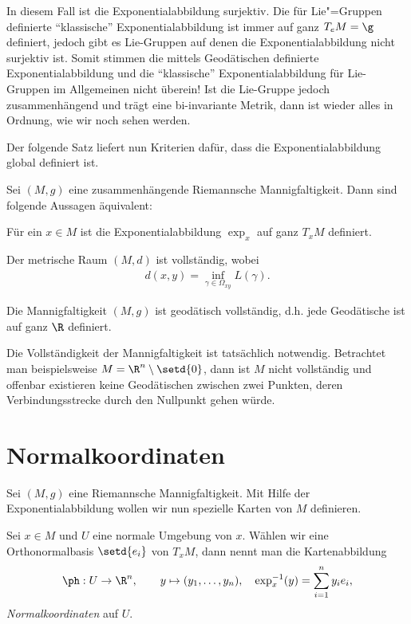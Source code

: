 \documentclass[%
	paper=a5,%
	fleqn,%
	DIV=18,%
	BCOR=0mm,
	fontsize=11pt,
	titlepage=false,%
	bibliography=totoc,
	DIV=18,%
	twoside=true,
	pdftitle=Riemannsche Geometrie,
	pdfauthor=Uwe Semmelmann,
	numbers=noendperiod]%
	{scrbook}
\begin{document}
\begin{rem}
In diesem Fall ist die Exponentialabbildung surjektiv. Die für Lie"=Gruppen definierte ``klassische'' Exponentialabbildung ist immer auf ganz $T_{e}M = \g$ definiert, jedoch gibt es Lie-Gruppen auf denen die Exponentialabbildung nicht surjektiv ist. Somit stimmen die mittels Geodätischen definierte Exponentialabbildung und die ``klassische'' Exponentialabbildung für Lie-Gruppen im Allgemeinen nicht überein! Ist die Lie-Gruppe jedoch zusammenhängend und trägt eine bi-invariante Metrik, dann ist wieder alles in Ordnung, wie wir noch sehen werden.\map 
\end{rem}

Der folgende Satz liefert nun Kriterien dafür, dass die Exponentialabbildung global definiert ist.

\begin{prop}
Sei $(M,g)$ eine zusammenhängende Riemannsche Mannigfaltigkeit. Dann sind folgende Aussagen äquivalent:
\begin{equivenum}
\item Für ein $x\in M$ ist die Exponentialabbildung $\exp_{x}$ auf ganz $T_{x}M$ definiert.
\item Der metrische Raum $(M,d)$ ist vollständig, wobei
\begin{align*}
d(x,y) = \inf_{\gamma\in\Omega_{xy}} L(\gamma).
\end{align*}
\item Die Mannigfaltigkeit $(M,g)$ ist geodätisch vollständig, d.h. jede Geodätische ist auf ganz $\R$ definiert.\fish
\end{equivenum}
\end{prop}

\begin{rem}
Die Vollständigkeit der Mannigfaltigkeit ist tatsächlich notwendig. Betrachtet man beispielsweise $M=\R^n\setminus\setd{0}$, dann ist $M$ nicht vollständig und offenbar existieren keine Geodätischen zwischen zwei Punkten, deren Verbindungsstrecke durch  den Nullpunkt gehen würde.\map
\end{rem}

\section{Normalkoordinaten}

Sei $(M,g)$ eine Riemannsche Mannigfaltigkeit. Mit Hilfe der
Exponentialabbildung wollen wir nun spezielle Karten von $M$ definieren.

\begin{defn}
Sei $x\in M$ und $U$ eine normale Umgebung von $x$. Wählen wir eine
Orthonormalbasis $\setd{e_i}$ von $T_xM$, dann nennt man die Kartenabbildung
\begin{align*}
\ph: U\to \R^n,\qquad
y \mapsto (y_1,\ldots,y_n),\quad \exp_x^{-1}(y) = \sum_{i=1}^n y_i e_i,
\end{align*}
\emph{Normalkoordinaten} auf $U$.\fish
\end{defn}
\end{document}
